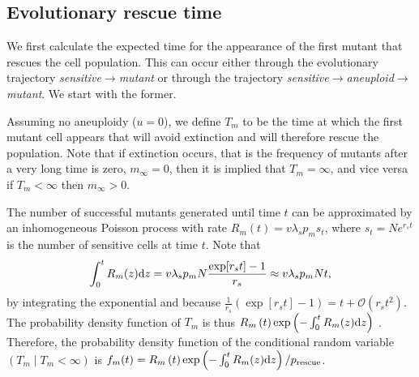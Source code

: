 \documentclass[12pt]{extarticle}
\renewcommand{\d}[1]{\ensuremath{\operatorname{d}\!{#1}}}
\renewcommand{\d}{{\rm d}}
\newcommand{\e}{e}
\newcommand{\presc}{p_\text{rescue}}
\newcommand{\bigo}[1]{\mathcal{O}\left(#1\right)}
\renewcommand{\Delta}{r}
\begin{document}
\begin{appendices}
\section{Evolutionary rescue time}\label{sec:appendix_rescue_time}

We first calculate the expected time for the appearance of the first mutant that rescues the cell population.
This can occur either through the evolutionary trajectory \textit{sensitive}$\rightarrow$\textit{mutant} or through the trajectory \textit{sensitive}$\rightarrow$\textit{aneuploid}$\rightarrow$\textit{mutant}.
We start with the former. 

Assuming no aneuploidy ($u=0$), we define $T_m$ to be the time at which the first mutant cell appears that will avoid extinction and will therefore rescue the population.
Note that if extinction occurs, that is the frequency of mutants after a very long time is zero, $m_{\infty}=0$, then it is implied that $T_m=\infty$, and vice versa if $T_m<\infty$ then $m_{\infty}>0$.

The number of successful mutants generated until time $t$ can be approximated by an inhomogeneous Poisson process with rate $R_m\left(t\right) = v\lambda_s p_m s_t$, %
where $s_t=N\e^{\Delta_s t}$ is the number of sensitive cells at time $t$.
Note that 
\begin{equation}\label{eq:integralR}
\int_0^{t}{R_m(z)\d z} = 
v\lambda_s p_m N \frac{\exp[{\Delta_s t}]-1}{\Delta_s} \approx 
v\lambda_s p_m N t,
\end{equation}
by integrating the exponential and because $\frac{1}{\Delta_s} \left(\exp[\Delta_s t]-1\right) = t+ \bigo{\Delta_s t^2}$. %
The probability density function of $T_m$ is thus
$R_m\left(t\right)\exp\left(-\int_0^{t}{R_m(z)\d z}\right)$ \citep{allen2010introduction}. 
Therefore, the probability density function of the conditional random variable $(T_m \mid T_m < \infty)$ is
$f_m(t) = R_m \left(t\right)\exp\left(-\int_0^{t}{R_m(z)\d z}\right) / \presc$. 
\\


\end{appendices}
\end{document}
